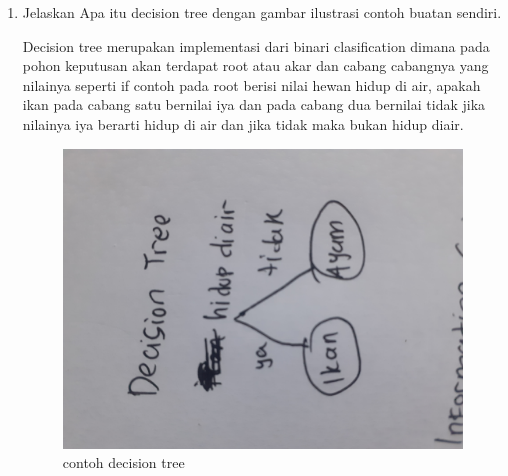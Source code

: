 \begin{enumerate}
		\item Jelaskan Apa itu decision tree dengan gambar ilustrasi contoh buatan sendiri.\par
		Decision tree merupakan implementasi dari binari clasification dimana pada pohon keputusan akan terdapat root atau akar dan cabang cabangnya yang nilainya seperti if contoh pada root berisi nilai hewan hidup di air, apakah ikan pada cabang satu bernilai iya dan pada cabang dua bernilai tidak jika nilainya iya berarti hidup di air dan jika tidak maka bukan hidup diair.
		\begin{figure}[ht]
			\centering
			\includegraphics[scale=0.01]{figures/1174043/chapter2/8.jpg}
			\caption{contoh decision tree}
			\label{contoh}
		\end{figure}
		

\end{enumerate}
